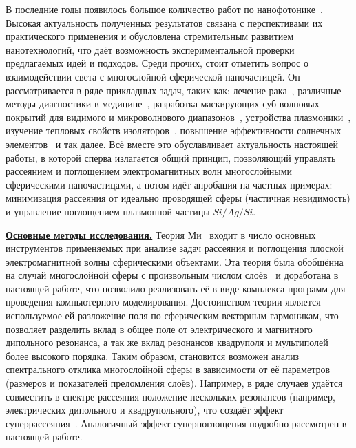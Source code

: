 {\actuality} 

В последние годы появилось большое количество работ по
нанофотонике~\cite{Tame-quantum-plasmonics-2013,
  Javier-graphene-plasmonics-2014, Khurgin-loss-plasmonics-2015,
  He-tunable-terahertz-graphene-metamaterials-2015,
  Segal-meta-nonlinar-PhC-2015,
  Poddubny-hyperbolic-metamaterials-2013, Kildishev-metasurface-2013}.
Высокая актуальность полученных результатов связана с перспективами их
практического применения и обусловлена стремительным развитием
нанотехнологий, что даёт возможность экспериментальной проверки
предлагаемых идей и подходов. Среди прочих, стоит отметить вопрос о
взаимодействии света с многослойной сферической наночастицей. Он
рассматривается в ряде прикладных задач, таких как: лечение
рака~\cite{Zhang-2010, Hirsch-2003}, различные методы диагностики в
медицине~\cite{Allain-2002}, разработка маскирующих суб-волновых
покрытий для видимого и микроволнового диапазонов~\cite{Qui-2009,
  Semouchkina-2013}, устройства плазмоники~\cite{Martin-2013,
  Alu-2005}, изучение тепловых свойств изоляторов~\cite{Xie-2013},
повышение эффективности солнечных элементов~\cite{Kameya-2011,
  Mann-2011} и так далее. Всё вместе это обуславливает актуальность
настоящей работы, в которой сперва излагается общий принцип,
позволяющий управлять рассеянием и поглощением электромагнитных волн
многослойными сферическими наночастицами, а потом идёт апробация на
частных примерах: минимизация рассеяния от идеально проводящей сферы
(частичная невидимость) и управление поглощением плазмонной частицы
$Si/Ag/Si$.

\underline{\textbf{Основные методы исследования.}}
Теория Ми~\cite{Mie-1908} входит в число основных инструментов применяемых
при анализе задач рассеяния и поглощения плоской электромагнитной
волны сферическими объектами. Эта теория была обобщённа на случай
многослойной сферы с произвольным числом слоёв~\cite{Yang-2003,
  Pena-scattnlay-2009} и доработана в настоящей работе, что позволило
реализовать её в виде комплекса программ для проведения компьютерного
моделирования. Достоинством теории является используемое ей разложение
поля по сферическим векторным гармоникам, что позволяет разделить
вклад в общее поле от электрического и магнитного дипольного
резонанса, а так же вклад резонансов квадруполя
и мультиполей более высокого порядка. Таким образом, становится
возможен анализ спектрального отклика многослойной сферы в зависимости
от её параметров (размеров и показателей преломления слоёв). Например,
в ряде случаев удаётся совместить в спектре рассеяния положение
нескольких резонансов (например, электрических дипольного и
квадрупольного), что создаёт эффект
суперрассеяния~\cite{Fan-2010,Fan-2011}. Аналогичный эффект
суперпоглощения подробно рассмотрен в настоящей работе.


